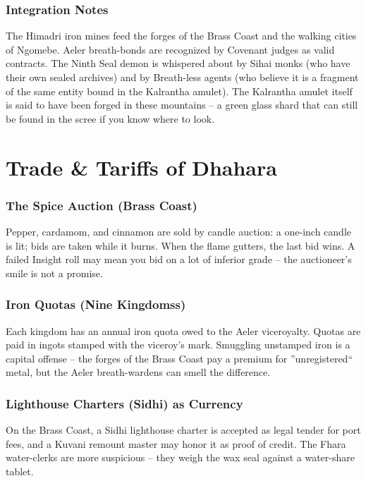 \documentclass[12pt,oneside]{book}
\begin{document}
\subsection*{Integration Notes}
The Himadri iron mines feed the forges of the Brass Coast and the walking cities of Ngomebe. Aeler breath-bonds are recognized by Covenant judges as valid contracts. The Ninth Seal demon is whispered about by Sihai monks (who have their own sealed archives) and by Breath-less agents (who believe it is a fragment of the same entity bound in the Kalrantha amulet). The Kalrantha amulet itself is said to have been forged in these mountains -- a green glass shard that can still be found in the scree if you know where to look.

\newpage

\newpage

\appendix

\chapter{Trade \& Tariffs of Dhahara}

\subsection*{The Spice Auction (Brass Coast)}
Pepper, cardamom, and cinnamon are sold by candle auction: a one-inch candle is lit; bids are taken while it burns. When the flame gutters, the last bid wins. A failed Insight roll may mean you bid on a lot of inferior grade -- the auctioneer's smile is not a promise.

\subsection*{Iron Quotas (Nine Kingdomss)}
Each kingdom has an annual iron quota owed to the Aeler viceroyalty. Quotas are paid in ingots stamped with the viceroy's mark. Smuggling unstamped iron is a capital offense -- the forges of the Brass Coast pay a premium for ''unregistered`` metal, but the Aeler breath-wardens can smell the difference.

\subsection*{Lighthouse Charters (Sidhi) as Currency}
On the Brass Coast, a Sidhi lighthouse charter is accepted as legal tender for port fees, and a Kuvani remount master may honor it as proof of credit. The Fhara water-clerks are more suspicious -- they weigh the wax seal against a water-share tablet.
\end{document}
